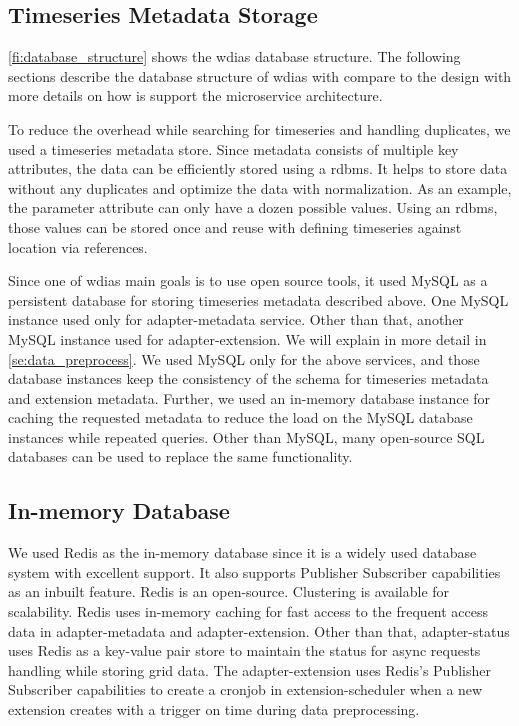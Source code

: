 \subsection{Timeseries Metadata Storage}
\label{subse:mysql}

\cref{fi:database_structure} shows the \acrshort{wdias} database structure.
The following sections describe the database structure of \acrshort{wdias} with compare to the design with more details on how is support the microservice architecture.

To reduce the overhead while searching for timeseries and handling duplicates, we used a timeseries metadata store. Since metadata consists of multiple key attributes, the data can be efficiently stored using a \acrfull{rdbms}. It helps to store data without any duplicates and optimize the data with normalization. As an example, the parameter attribute can only have a dozen possible values. Using an \acrshort{rdbms}, those values can be stored once and reuse with defining timeseries against location via references.

Since one of \acrshort{wdias} main goals is to use open source tools, it used MySQL as a persistent database for storing timeseries metadata described above. One MySQL instance used only for adapter-metadata service. Other than that, another MySQL instance used for adapter-extension. We will explain in more detail in \cref{se:data_preprocess}. We used MySQL only for the above services, and those database instances keep the consistency of the schema for timeseries metadata and extension metadata. Further, we used an in-memory database instance for caching the requested metadata to reduce the load on the MySQL database instances while repeated queries. Other than MySQL, many open-source SQL databases can be used to replace the same functionality.

\subsection{In-memory Database}
\label{subse:redis}

We used Redis \cite{redisRedisDocumentation} as the in-memory database since it is a widely used database system with excellent support. It also supports Publisher Subscriber capabilities as an inbuilt feature. Redis is an open-source. Clustering is available for scalability. Redis uses in-memory caching for fast access to the frequent access data in adapter-metadata and adapter-extension. Other than that, adapter-status uses Redis as a key-value pair store to maintain the status for async requests handling while storing grid data. The adapter-extension uses Redis's Publisher Subscriber capabilities to create a cronjob in extension-scheduler when a new extension creates with a trigger on time during data preprocessing.


